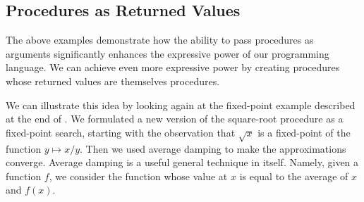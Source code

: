\subsection{Procedures as Returned Values}
\label{Section 1.3.4}

The above examples demonstrate how the ability to pass procedures as arguments significantly enhances the expressive power of our programming language.
We can achieve even more expressive power by creating procedures whose returned values are themselves procedures.

We can illustrate this idea by looking again at the fixed-point example described at the end of .
We formulated a new version of the square-root procedure as a fixed-point search, starting with the observation that \( \sqrt{x} \) is a fixed-point of the function \( y \mapsto x / y \).
Then we used average damping to make the approximations converge.
Average damping is a useful general technique in itself.
Namely, given a function \( f \), we consider the function whose value at \( x \) is equal to the average of \( x \) and \( f(x) \).

